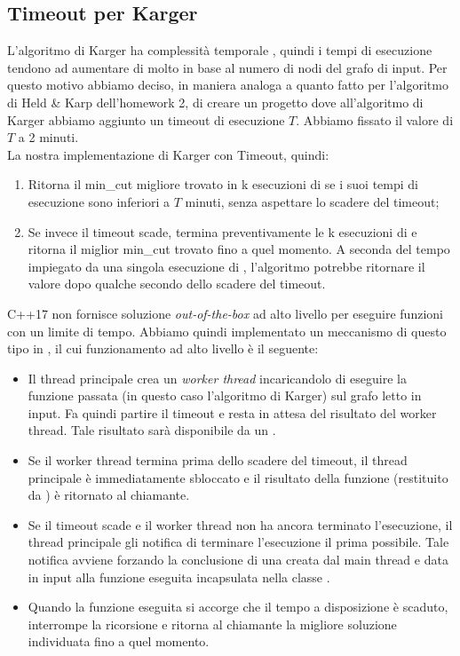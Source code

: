 \subsection{Timeout per Karger}

\noindent L'algoritmo di Karger ha complessità temporale \complexityKargerTime{}, quindi i tempi di esecuzione tendono ad aumentare di molto in base al numero di nodi del grafo di input. Per questo motivo abbiamo deciso, in maniera analoga a quanto fatto per l'algoritmo di Held \& Karp dell'homework 2, di creare un progetto dove all'algoritmo di Karger abbiamo aggiunto un timeout di esecuzione $T$. Abbiamo fissato il valore di $T$ a 2 minuti.\\

\noindent La nostra implementazione di Karger con Timeout, quindi:

\begin{enumerate}
    \item Ritorna il min\_cut migliore trovato in k esecuzioni di  se i suoi tempi di esecuzione sono inferiori a $T$ minuti, senza aspettare lo scadere del timeout;
    \item Se invece il timeout scade, termina preventivamente le k esecuzioni di  e ritorna il miglior min\_cut trovato fino a quel momento. A seconda del tempo impiegato da una singola esecuzione di , l'algoritmo potrebbe ritornare il valore dopo qualche secondo dello scadere del timeout.
\end{enumerate}

\noindent C++17 non fornisce soluzione \textit{out-of-the-box} ad alto livello per eseguire funzioni con un limite di tempo. Abbiamo quindi implementato un meccanismo di questo tipo in , il cui funzionamento ad alto livello è il seguente:

\begin{itemize}
    \item Il thread principale crea un \textit{worker thread} incaricandolo di eseguire la funzione passata (in questo caso l'algoritmo di Karger) sul grafo letto in input. Fa quindi partire il timeout e resta in attesa del risultato del worker thread. Tale risultato sarà disponibile da un .
    \item Se il worker thread termina prima dello scadere del timeout, il thread principale è immediatamente sbloccato e il risultato della funzione (restituito da ) è ritornato al chiamante.
    \item Se il timeout scade e il worker thread non ha ancora terminato l'esecuzione, il thread principale gli notifica di terminare l'esecuzione il prima possibile. Tale notifica avviene forzando la conclusione di una  creata dal main thread e data in input alla funzione eseguita incapsulata nella classe .
    \item Quando la funzione eseguita si accorge che il tempo a disposizione è scaduto, interrompe la ricorsione e ritorna al chiamante la migliore soluzione individuata fino a quel momento.
\end{itemize}
